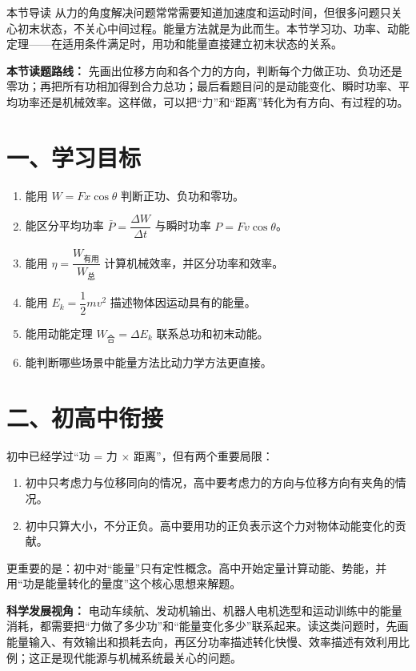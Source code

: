 
\begin{learningbox}{本节导读}
从力的角度解决问题常常需要知道加速度和运动时间，但很多问题只关心初末状态，不关心中间过程。能量方法就是为此而生。本节学习功、功率、动能定理——在适用条件满足时，用功和能量直接建立初末状态的关系。
\end{learningbox}

\textbf{本节读题路线：} 先画出位移方向和各个力的方向，判断每个力做正功、负功还是零功；再把所有功相加得到合力总功；最后看题目问的是动能变化、瞬时功率、平均功率还是机械效率。这样做，可以把“力”和“距离”转化为有方向、有过程的功。

\section*{一、学习目标}

\begin{enumerate}
  \item 能用 $W = Fx\cos\theta$ 判断正功、负功和零功。
  \item 能区分平均功率 $\bar P = \dfrac{\Delta W}{\Delta t}$ 与瞬时功率 $P=Fv\cos\theta$。
  \item 能用 $\eta=\dfrac{W_{\text{有用}}}{W_{\text{总}}}$ 计算机械效率，并区分功率和效率。
  \item 能用 $E_k = \dfrac12 mv^2$ 描述物体因运动具有的能量。
  \item 能用动能定理 $W_{\text{合}} = \Delta E_k$ 联系总功和初末动能。
  \item 能判断哪些场景中能量方法比动力学方法更直接。
\end{enumerate}
\section*{二、初高中衔接}

初中已经学过“功 = 力 × 距离”，但有两个重要局限：
\begin{enumerate}
  \item 初中只考虑力与位移同向的情况，高中要考虑力的方向与位移方向有夹角的情况。
  \item 初中只算大小，不分正负。高中要用功的正负表示这个力对物体动能变化的贡献。
\end{enumerate}

更重要的是：初中对“能量”只有定性概念。高中开始定量计算动能、势能，并用“功是能量转化的量度”这个核心思想来解题。

\textbf{科学发展视角：} 电动车续航、发动机输出、机器人电机选型和运动训练中的能量消耗，都需要把“力做了多少功”和“能量变化多少”联系起来。读这类问题时，先画能量输入、有效输出和损耗去向，再区分功率描述转化快慢、效率描述有效利用比例；这正是现代能源与机械系统最关心的问题。

